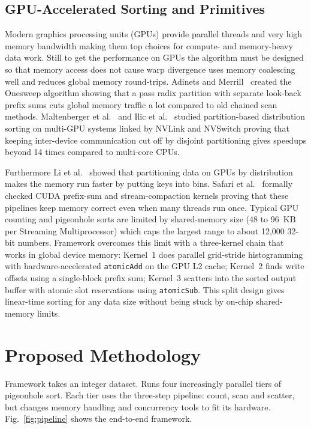 \documentclass[conference]{IEEEtran}
\begin{document}
\subsection{GPU-Accelerated Sorting and Primitives}
Modern graphics processing units (GPUs) provide parallel threads and very high memory bandwidth making them top choices for compute- and memory-heavy data work. Still to get the performance on GPUs the algorithm must be designed so that memory access does not cause warp divergence uses memory coalescing well and reduces global memory round-trips. Adinets and Merrill~\cite{adinets2022} created the Onesweep algorithm showing that a pass radix partition with separate look-back prefix sums cuts global memory traffic a lot compared to old chained scan methods. Maltenberger et al.~\cite{maltenberger2022} and Ilic et al.~\cite{ilic2023} studied partition-based distribution sorting on multi-GPU systems linked by NVLink and NVSwitch proving that keeping inter-device communication cut off by disjoint partitioning gives speedups beyond 14 times compared to multi-core CPUs.

Furthermore Li et al.~\cite{lik2024} showed that partitioning data on GPUs by distribution makes the memory run faster by putting keys into bins. Safari et al.~\cite{safari2022} formally checked CUDA prefix-sum and stream-compaction kernels proving that these pipelines keep memory correct even when many threads run once. Typical GPU counting and pigeonhole sorts are limited by shared-memory size (48 to 96~KB per Streaming Multiprocessor) which caps the largest range to about 12,000 32-bit numbers. Framework overcomes this limit with a three-kernel chain that works in global device memory: Kernel~1 does parallel grid-stride histogramming with hardware-accelerated \texttt{atomicAdd} on the GPU L2 cache; Kernel~2 finds write offsets using a single-block prefix sum; Kernel~3 scatters into the sorted output buffer with atomic slot reservations using \texttt{atomicSub}. This split design gives linear-time sorting for any data size without being stuck by on-chip shared-memory limits.

\section{Proposed Methodology}
Framework takes an integer dataset. Runs four increasingly parallel tiers of pigeonhole sort. Each tier uses the three-step pipeline: count, scan and scatter, but changes memory handling and concurrency tools to fit its hardware. Fig.~\ref{fig:pipeline} shows the end-to-end framework.
\end{document}
